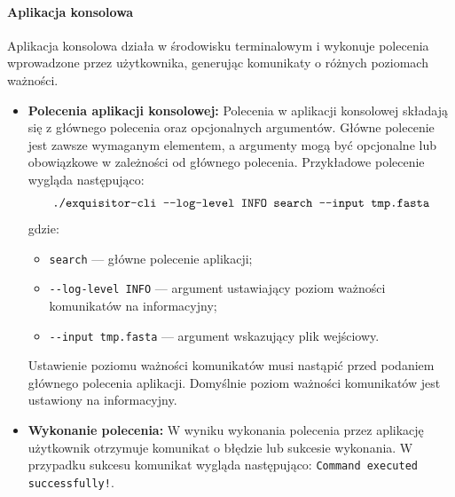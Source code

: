             \paragraph{Aplikacja konsolowa}

                Aplikacja konsolowa działa w środowisku terminalowym i wykonuje polecenia wprowadzone przez użytkownika, generując komunikaty o różnych poziomach ważności.

                \begin{itemize}

                    \item{
                        \textbf{Polecenia aplikacji konsolowej:}
                        Polecenia w aplikacji konsolowej składają się z głównego polecenia oraz opcjonalnych argumentów. Główne polecenie jest zawsze wymaganym elementem, a argumenty mogą być opcjonalne lub obowiązkowe w zależności od głównego polecenia.
                        Przykładowe polecenie wygląda następująco:
                        \[
                            \texttt{./exquisitor-cli -\phantom{}-log-level INFO search -\phantom{}-input tmp.fasta}
                        \]
                        gdzie:
                        \begin{itemize}
                            \item {
                                \texttt{search} — główne polecenie aplikacji;
                            }
                            \item {
                                \texttt{-\phantom{}-log-level INFO} — argument ustawiający poziom ważności komunikatów na informacyjny;
                            }
                            \item {
                                \texttt{-\phantom{}-input tmp.fasta} — argument wskazujący plik wejściowy.
                            }
                        \end{itemize}
                        Ustawienie poziomu ważności komunikatów musi nastąpić przed podaniem głównego polecenia aplikacji. Domyślnie poziom ważności komunikatów jest ustawiony na informacyjny.
                    }
                    \item {
                        \textbf{Wykonanie polecenia:}
                        W wyniku wykonania polecenia przez aplikację użytkownik otrzymuje komunikat o błędzie lub sukcesie wykonania. W przypadku sukcesu komunikat wygląda następująco:
                        \texttt{Command executed successfully!}.
}
\end{itemize}
